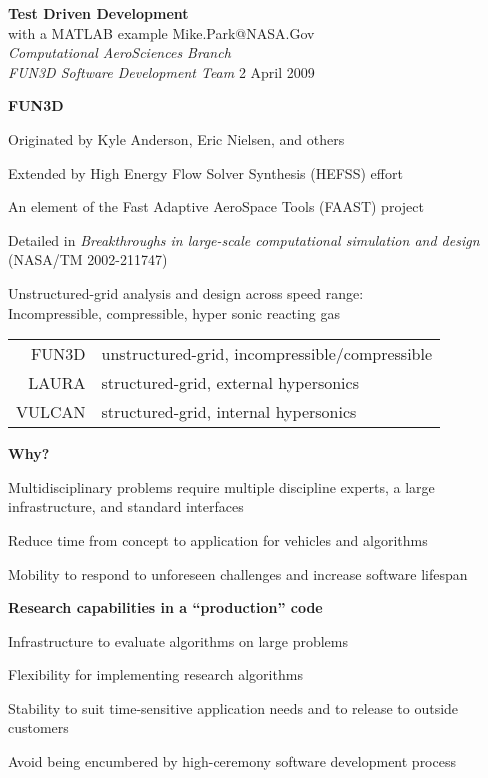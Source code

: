 \documentclass[landscape]{slides}
\renewcommand{\title}[1]{{\large\bfseries #1}}
\newenvironment{itemiz}%
  {\begin{list}{}{\raggedright
      \setlength{\itemsep}{2pt}%
      \setlength{\parskip}{4pt}\setlength{\parsep}{2pt}}}%
  {\end{list}}%
\begin{document}
\raggedright

  \begin{titlepage}
    \thispagestyle{empty}
     {\bfseries\Large Test Driven Development}\\ with a MATLAB example
     \vfill
	 {\large Mike.Park@NASA.Gov} \\
	 {\itshape Computational AeroSciences Branch} \\
	 {\itshape FUN3D Software Development Team}
	 \vfill
	     { 2 April 2009}\\
  \end{titlepage}

  \begin{slide}
    \title{FUN3D}

    Originated by Kyle Anderson, Eric Nielsen, and others

    Extended by High Energy Flow Solver Synthesis (HEFSS) effort

    An element of the Fast Adaptive AeroSpace Tools (FAAST) project

    Detailed in \emph{Breakthroughs in large-scale computational simulation
    and design} {\tiny (NASA/TM 2002-211747)}

    Unstructured-grid analysis and design across speed range:\\
    Incompressible, compressible, hyper sonic reacting gas

    \begin{tabular}{rl}
      FUN3D & unstructured-grid, incompressible/compressible \\
      LAURA & structured-grid, external hypersonics \\
      VULCAN & structured-grid, internal hypersonics 
    \end{tabular}
  \end{slide}
 
 \begin{slide}
  \title{Why?}
  \begin{itemiz}
   \item Multidisciplinary problems require multiple discipline
   experts, a large infrastructure, and standard interfaces
   \vspace{6pt}
   \item Reduce time from concept to application for vehicles and algorithms
   \vspace{6pt}
   \item Mobility to respond to unforeseen challenges and increase
   software lifespan
  \end{itemiz}

  \title{Research capabilities in a ``production'' code}
  \begin{itemiz}
    \item Infrastructure to evaluate algorithms on large problems
    \item Flexibility for implementing research algorithms 
    \item Stability to suit time-sensitive application needs and to
    release to outside customers
    \item Avoid being encumbered by high-ceremony software development process
  \end{itemiz}
 \end{slide}
 
\end{document}
